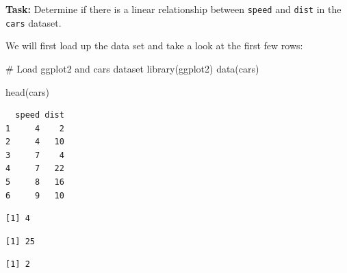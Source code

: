 \documentclass[
  letterpaper,
  DIV=11,
  numbers=noendperiod]{scrreprt}
\newenvironment{Shaded}{\begin{snugshade}}{\end{snugshade}}
\newcommand{\CommentTok}[1]{\textcolor[rgb]{0.37,0.37,0.37}{#1}}
\newcommand{\FunctionTok}[1]{\textcolor[rgb]{0.28,0.35,0.67}{#1}}
\newcommand{\NormalTok}[1]{\textcolor[rgb]{0.00,0.23,0.31}{#1}}
\newcommand{\SpecialCharTok}[1]{\textcolor[rgb]{0.37,0.37,0.37}{#1}}
\begin{document}
\textbf{Task:} Determine if there is a linear relationship between
\texttt{speed} and \texttt{dist} in the \texttt{cars} dataset.

We will first load up the data set and take a look at the first few
rows:

\begin{Shaded}
\begin{Highlighting}[]
\CommentTok{\# Load ggplot2 and cars dataset}
\FunctionTok{library}\NormalTok{(ggplot2)}
\FunctionTok{data}\NormalTok{(cars)}

\FunctionTok{head}\NormalTok{(cars)}
\end{Highlighting}
\end{Shaded}

\begin{verbatim}
  speed dist
1     4    2
2     4   10
3     7    4
4     7   22
5     8   16
6     9   10
\end{verbatim}

\begin{Shaded}
\end{Shaded}

\begin{verbatim}
[1] 4
\end{verbatim}

\begin{Shaded}
\end{Shaded}

\begin{verbatim}
[1] 25
\end{verbatim}

\begin{Shaded}
\end{Shaded}

\begin{verbatim}
[1] 2
\end{verbatim}

\begin{Shaded}
\end{Shaded}
\end{document}
